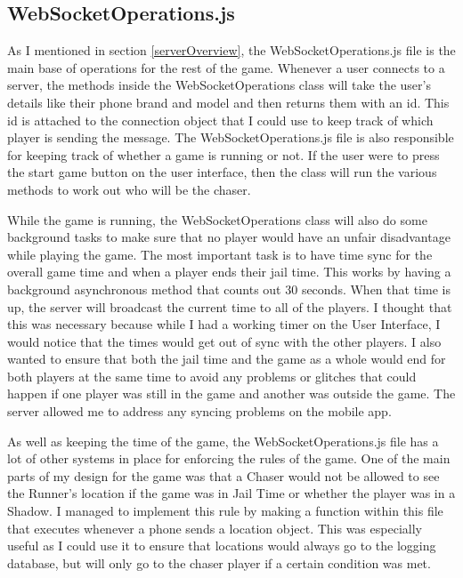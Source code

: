 \documentclass{l4proj}
\begin{document}
\subsection{WebSocketOperations.js}
As I mentioned in section \ref{serverOverview}, the WebSocketOperations.js file is the main base of operations for
the rest of the game. Whenever a user connects to a server, the methods inside the WebSocketOperations class will take
the user's details like their phone brand and model and then returns them with an id. This id is attached to the connection
object that I could use to keep track of which player is sending the message. The WebSocketOperations.js file is also
responsible for keeping track of whether a game is running or not. If the user were to press the start game button on the
user interface, then the class will run the various methods to work out who will be the chaser.

While the game is running, the WebSocketOperations class will also do some background tasks to make sure that no
player would have an unfair disadvantage while playing the game. The most important task is to have time sync for
the overall game time and when a player ends their jail time. This works by having a background asynchronous method
that counts out 30 seconds. When that time is up, the server will broadcast the current time to all of the players.
I thought that this was necessary because while I had a working timer on the User Interface, I would
notice that the times would get out of sync with the other players. I also wanted to ensure that both the jail time
and the game as a whole would end for both players at the same time to avoid any problems or glitches that could happen
if one player was still in the game and another was outside the game. The server allowed me to address any syncing
problems on the mobile app.

As well as keeping the time of the game, the WebSocketOperations.js file has a lot of other systems in place for enforcing the
rules of the game. One of the main parts of my design for the game was that a Chaser would not be allowed to see the Runner's
location if the game was in Jail Time or whether the player was in a Shadow. I managed to implement this rule by making
a function within this file that executes whenever a phone sends a location object. This was especially useful as I could
use it to ensure that locations would always go to the logging database, but will only go to the chaser player if a certain
condition was met.
\end{document}
